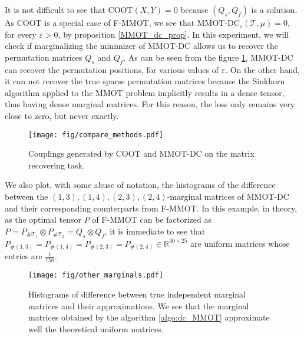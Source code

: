 \documentclass{article}
\begin{document}
It is not difficult to see that $\text{COOT}(X,Y) = 0$ because $(Q_s, Q_f)$ is a solution. As COOT is a special case of F-MMOT, 
we see that $\text{MMOT-DC}_{\varepsilon}(\mathcal T, \mu) = 0$, for every $\varepsilon > 0$, 
by proposition \ref{MMOT_dc_prop}. In this experiment, we will check if marginalizing the minimizer of MMOT-DC allows us to recover 
the permutation matrices $Q_s$ and $Q_f$.
As can be seen from the figure \ref{fig:permu}, MMOT-DC can recover the permutation positions, for various 
values of $\varepsilon$. On the other hand, it can not recover the true sparse permutation matrices because the Sinkhorn algorithm 
applied to the MMOT problem implicitly results in a dense tensor, thus having dense marginal matrices. For this reason, 
the loss only remains very close to zero, but never exactly.
\begin{figure}[t]
  \centering
  \texttt{[image: fig/compare\_methods.pdf]}
  \caption{Couplings generated by COOT and MMOT-DC on the matrix recovering task.}
  \label{fig:permu}
\end{figure}

We also plot, with some abuse of notation, the histograms of the difference between
the $(1,3), (1,4), (2,3), (2,4)$-marginal matrices of MMOT-DC and their corresponding counterparts from F-MMOT. 
In this example, in theory, as the optimal tensor $P$ of F-MMOT can be factorized as 
$P = P_{\# \mathcal T_1} \otimes P_{\# \mathcal T_2} = Q_s \otimes Q_f$, 
it is immediate to see that $P_{\# (1,3)} = P_{\# (1,4)} = P_{\# (2,3)} = P_{\# (2,4)} \in \mathbb R^{30 \times 25}$ 
are uniform matrices whose entries are $\frac{1}{750}$.
\begin{figure}[t]
  \centering
  \texttt{[image: fig/other\_marginals.pdf]}
  \caption{Histograms of difference between true independent marginal matrices and their approximations. We see that the marginal matrices obtained 
  by the algorithm \ref{algo:dc_MMOT} approximate well the theoretical uniform matrices.}
  \label{fig:other_marg}
\end{figure}

\end{document}
